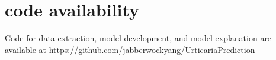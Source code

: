 \documentclass[final,3p,times,authoryear]{elsarticle}
\begin{document}









\section{code availability}\label{code}
Code for data extraction, model development, and model explanation are available at \url{https://github.com/jabberwockyang/UrticariaPrediction}
\end{document}
